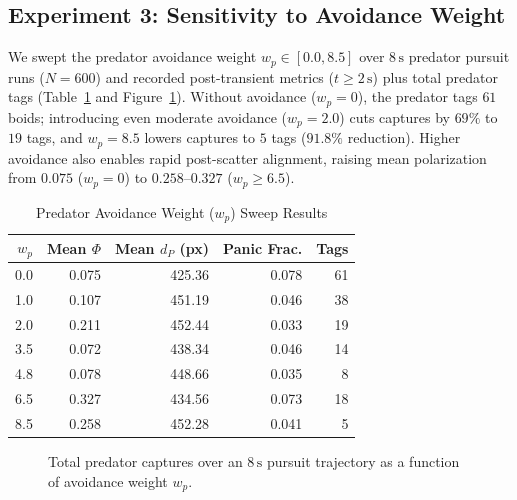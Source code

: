 \documentclass[10pt,twocolumn]{article}
\begin{document}
\subsection{Experiment 3: Sensitivity to Avoidance Weight}
We swept the predator avoidance weight $w_p \in [0.0, 8.5]$ over $8\,\text{s}$ predator pursuit runs ($N=600$) and recorded post-transient metrics ($t \ge 2\,\text{s}$) plus total predator tags (Table~\ref{tab:sweep} and Figure~\ref{fig:sweep}). Without avoidance ($w_p = 0$), the predator tags $61$ boids; introducing even moderate avoidance ($w_p = 2.0$) cuts captures by $69\%$ to $19$ tags, and $w_p = 8.5$ lowers captures to $5$ tags ($91.8\%$ reduction). Higher avoidance also enables rapid post-scatter alignment, raising mean polarization from $0.075$ ($w_p=0$) to $0.258$--$0.327$ ($w_p \ge 6.5$).

\begin{table}[t]
\centering
\caption{Predator Avoidance Weight ($w_p$) Sweep Results}
\label{tab:sweep}
\small
\begin{tabular}{@{}rrrrr@{}}
\toprule
$w_p$ & Mean $\Phi$ & Mean $d_P$ (px) & Panic Frac. & Tags \\
\midrule
0.0 & 0.075 & 425.36 & 0.078 & 61 \\
1.0 & 0.107 & 451.19 & 0.046 & 38 \\
2.0 & 0.211 & 452.44 & 0.033 & 19 \\
3.5 & 0.072 & 438.34 & 0.046 & 14 \\
4.8 & 0.078 & 448.66 & 0.035 & 8  \\
6.5 & 0.327 & 434.56 & 0.073 & 18 \\
8.5 & 0.258 & 452.28 & 0.041 & 5  \\
\bottomrule
\end{tabular}
\end{table}

\begin{figure}[t]
\centering
{}
\caption{Total predator captures over an $8\,\text{s}$ pursuit trajectory as a function of avoidance weight $w_p$.}
\label{fig:sweep}
\end{figure}
\end{document}
